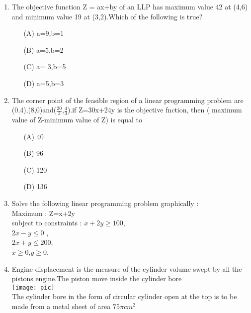 \documentclass{article}
\newcommand\tab[1][1cm]{\hspace*{#1}}
\begin{document}
\begin{enumerate}
	\item The objective function Z = ax+by of an LLP has maximum value 42 at (4,6) and minimum value 19 at (3,2).Which of the following is true?
		
		\begin{enumerate}
				\item[(A)] a=9,b=1
		        	\item[(B)] a=5,b=2
				\item[(C)] a= 3,b=5
				\item[(D)] a=5,b=3
			
		\end{enumerate}
		
	\item The corner point of the feasible region of a linear programming problem are (0,4),(8,0)and($\frac{20}{3}$,$\frac{4}{3}$).if Z=30x+24y is the objective fnction, then ( maximum value of Z-minimum value of Z) is equal to 
		
		\begin{enumerate}
				\item[(A)] 40
				\item[(B)] 96
				\item[(C)] 120
				\item[(D)] 136
		\end{enumerate}
		
		
	\item
	 Solve the following linear programming problem graphically : \\
		Maximum : Z=x+2y \\
		subject to constraints  :  $ x+2y \ge 100 $,\\
		\tab[3.5cm]   $ 2x-y \le 0 $ , \\
		\tab[3.5cm]   $ 2x+y \le 200 $, \\
		\tab[3.5cm]   $ x \ge 0 $,$ y \ge 0 $.
					

			      \item
		Engine displacement is the measure of the cylinder volume swept by all the pistons engine.The piston move inside the cylinder bore \\
		
		\texttt{[image: pic]}\\
	
		The cylinder bore in the form of circular cylinder open at the top is to be made from a metal sheet of area $ 75 \pi cm^2 $ \\
		

\end{enumerate}
\end{document}
